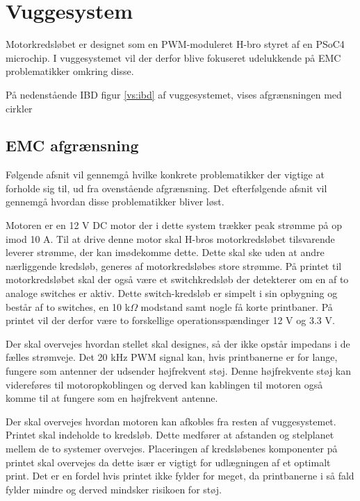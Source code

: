 \chapter{Vuggesystem}

Motorkredsløbet er designet som en PWM-moduleret H-bro styret af en PSoC4 microchip. I vuggesystemet vil der derfor blive fokuseret udelukkende på EMC problematikker omkring disse.

På nedenstående IBD figur \ref{vs:ibd} af vuggesystemet, vises afgrænsningen med cirkler


\section{EMC afgrænsning}

Følgende afsnit vil gennemgå hvilke konkrete problematikker der vigtige at forholde sig til, ud fra ovenstående afgrænsning. Det efterfølgende afsnit vil gennemgå hvordan disse problematikker bliver løst.

Motoren er en 12 V DC motor der i dette system trækker peak strømme på op imod 10 A. Til at drive denne motor skal H-bros motorkredsløbet tilsvarende leverer strømme, der kan imødekomme dette. Dette skal ske uden at andre nærliggende kredsløb, generes af motorkredsløbes store strømme. På printet til motorkredsløbet skal der også være et switchkredsløb der detekterer om en af to analoge switches er aktiv. Dette switch-kredsløb er simpelt i sin opbygning og består af to switches, en 10 k$\Omega$ modstand samt nogle få korte printbaner. På printet vil der derfor være to forskellige operationsspændinger 12 V og 3.3 V.

Der skal overvejes hvordan stellet skal designes, så der ikke opstår impedans i de fælles strømveje.
Det 20 kHz PWM signal kan, hvis printbanerne er for lange, fungere som antenner der udsender højfrekvent støj.
Denne højfrekvente støj kan videreføres til motoropkoblingen og derved kan kablingen til motoren også komme til at fungere som en højfrekvent antenne.

Der skal overvejes hvordan motoren kan afkobles fra resten af vuggesystemet.
Printet skal indeholde to kredsløb. Dette medfører at afstanden og stelplanet mellem de to systemer overvejes.
Placeringen af kredsløbenes komponenter på printet skal overvejes da dette især er vigtigt for udlægningen af et optimalt print. Det er en fordel hvis printet ikke fylder for meget, da printbanerne i så fald fylder mindre og derved mindsker risikoen for støj.

